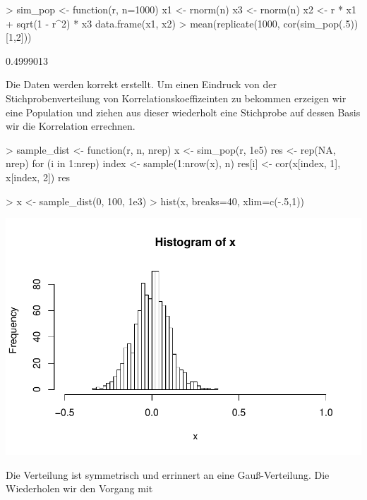 \begin{Schunk}
\begin{Sinput}
> sim_pop <- function(r, n=1000){
   x1 <- rnorm(n)
   x3 <- rnorm(n)
   x2 <- r * x1 + sqrt(1 - r^2) * x3
   data.frame(x1, x2) 
 }
> mean(replicate(1000, cor(sim_pop(.5))[1,2]))
\end{Sinput}
\begin{Soutput}
[1] 0.4999013
\end{Soutput}
\end{Schunk}

Die Daten werden korrekt erstellt. Um einen Eindruck von der Stichprobenverteilung von Korrelationskoeffizeinten zu bekommen erzeigen wir eine Population und ziehen aus dieser wiederholt eine Stichprobe auf dessen Basis wir die Korrelation errechnen.

\begin{Schunk}
\begin{Sinput}
> sample_dist <- function(r, n, nrep){
   x <- sim_pop(r, 1e5)
   res <- rep(NA, nrep)
   for (i in 1:nrep){
     index <- sample(1:nrow(x), n)
     res[i] <- cor(x[index, 1], x[index, 2])  
   }
   res  
 }
\end{Sinput}
\end{Schunk}

\begin{Schunk}
\begin{Sinput}
> x <- sample_dist(0, 100, 1e3)
> hist(x, breaks=40, xlim=c(-.5,1))  
\end{Sinput}
\end{Schunk}
\includegraphics{sim_correlation-005}

Die Verteilung ist symmetrisch und errinnert an eine Gauß-Verteilung.
Die Wiederholen wir den Vorgang mit 


